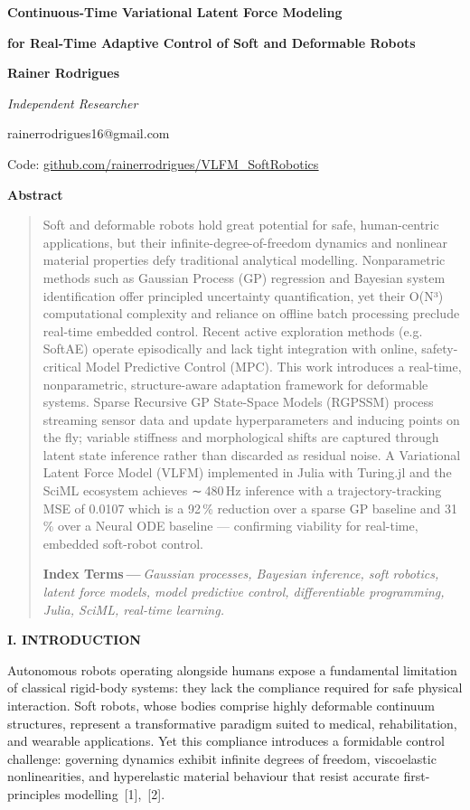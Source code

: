 \documentclass[letterpaper, 10pt, journal, twoside]{IEEEtran}
\author{}
\date{}
\begin{document}
\textbf{Continuous-Time Variational Latent Force Modeling}

\textbf{for Real-Time Adaptive Control of Soft and Deformable Robots}

\textbf{Rainer Rodrigues}

\emph{Independent Researcher}

rainerrodrigues16@gmail.com

Code:
\href{https://github.com/rainerrodrigues/VLFM_SoftRobotics}{\ul{github.com/rainerrodrigues/VLFM\_SoftRobotics}}

\textbf{Abstract}

\begin{quote}
Soft and deformable robots hold great potential for safe, human-centric
applications, but their infinite-degree-of-freedom dynamics and
nonlinear material properties defy traditional analytical modelling.
Nonparametric methods such as Gaussian Process (GP) regression and
Bayesian system identification offer principled uncertainty
quantification, yet their O(N³) computational complexity and reliance on
offline batch processing preclude real-time embedded control. Recent
active exploration methods (e.g. SoftAE) operate episodically and lack
tight integration with online, safety-critical Model Predictive Control
(MPC). This work introduces a real-time, nonparametric, structure-aware
adaptation framework for deformable systems. Sparse Recursive GP
State-Space Models (RGPSSM) process streaming sensor data and update
hyperparameters and inducing points on the fly; variable stiffness and
morphological shifts are captured through latent state inference rather
than discarded as residual noise. A Variational Latent Force Model
(VLFM) implemented in Julia with Turing.jl and the SciML ecosystem
achieves ∼ 480\,Hz inference with a trajectory-tracking MSE of 0.0107
which is a 92\,\% reduction over a sparse GP baseline and 31\,\% over a
Neural ODE baseline --- confirming viability for real-time, embedded
soft-robot control.

\textbf{Index Terms --- }\emph{Gaussian processes, Bayesian inference,
soft robotics, latent force models, model predictive control,
differentiable programming, Julia, SciML, real-time learning.}
\end{quote}

\textbf{I. INTRODUCTION}

Autonomous robots operating alongside humans expose a fundamental
limitation of classical rigid-body systems: they lack the compliance
required for safe physical interaction. Soft robots, whose bodies
comprise highly deformable continuum structures, represent a
transformative paradigm suited to medical, rehabilitation, and wearable
applications. Yet this compliance introduces a formidable control
challenge: governing dynamics exhibit infinite degrees of freedom,
viscoelastic nonlinearities, and hyperelastic material behaviour that
resist accurate first-principles modelling~{[}1{]},~{[}2{]}.
\end{document}
